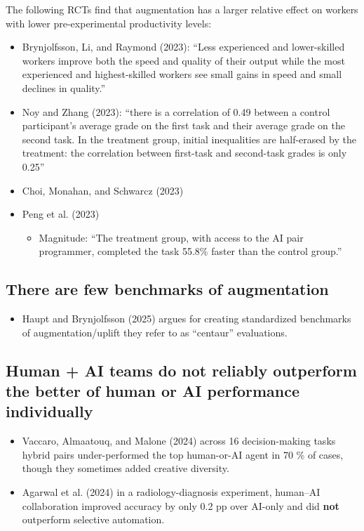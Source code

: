 \documentclass[
  letterpaper,
  DIV=11,
  numbers=noendperiod,
  oneside]{scrartcl}
\providecommand{\tightlist}{%
  \setlength{\itemsep}{0pt}\setlength{\parskip}{0pt}}
\begin{document}
The following RCTs find that augmentation has a larger relative effect
on workers with lower pre-experimental productivity levels:

\begin{itemize}
\tightlist
\item
  Brynjolfsson, Li, and Raymond (2023): ``Less experienced and
  lower-skilled workers improve both the speed and quality of their
  output while the most experienced and highest-skilled workers see
  small gains in speed and small declines in quality.''
\item
  Noy and Zhang (2023): ``there is a correlation of 0.49 between a
  control participant's average grade on the first task and their
  average grade on the second task. In the treatment group, initial
  inequalities are half-erased by the treatment: the correlation between
  first-task and second-task grades is only 0.25''
\item
  Choi, Monahan, and Schwarcz (2023)
\item
  Peng et al. (2023)

  \begin{itemize}
  \tightlist
  \item
    Magnitude: ``The treatment group, with access to the AI pair
    programmer, completed the task 55.8\% faster than the control
    group.''
  \end{itemize}
\end{itemize}

\subsection{There are few benchmarks of
augmentation}\label{there-are-few-benchmarks-of-augmentation}

\begin{itemize}
\tightlist
\item
  Haupt and Brynjolfsson (2025) argues for creating standardized
  benchmarks of augmentation/uplift they refer to as ``centaur''
  evaluations.
\end{itemize}

\subsection{Human + AI teams do not reliably outperform the better of
human or AI performance
individually}\label{human-ai-teams-do-not-reliably-outperform-the-better-of-human-or-ai-performance-individually}

\begin{itemize}
\item
  Vaccaro, Almaatouq, and Malone (2024) across 16 decision-making tasks
  hybrid pairs under-performed the top human-or-AI agent in 70 \% of
  cases, though they sometimes added creative diversity.
\item
  Agarwal et al. (2024) in a radiology-diagnosis experiment, human--AI
  collaboration improved accuracy by only 0.2 pp over AI-only and did
  \textbf{not} outperform selective automation.
\end{itemize}
\end{document}
